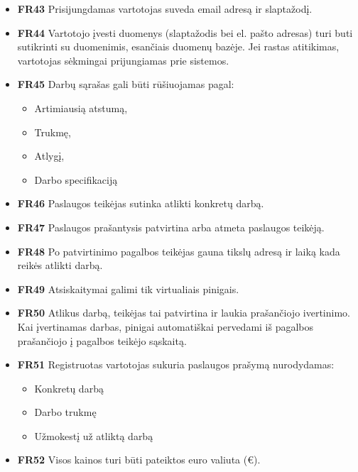 \documentclass{VUMIFPSbakalaurinis}
\begin{document}
\begin{itemize}
	\item \textbf{FR43} Prisijungdamas vartotojas suveda email adresą ir slaptažodį.
	\item \textbf{FR44} Vartotojo įvesti duomenys (slaptažodis bei el. pašto adresas) turi buti sutikrinti su duomenimis, esančiais duomenų bazėje. Jei rastas atitikimas, vartotojas sėkmingai prijungiamas prie sistemos.
\end{itemize}

\begin{itemize}
	\item \textbf{FR45} Darbų sąrašas gali būti rūšiuojamas pagal:
	\begin{itemize}
		\item Artimiausią atstumą,
		\item Trukmę,
		\item Atlygį,
		\item Darbo specifikaciją
	\end{itemize}
\end{itemize}

\begin{itemize}
	\item \textbf{FR46} Paslaugos teikėjas sutinka atlikti konkretų darbą.
	\item \textbf{FR47} Paslaugos prašantysis patvirtina arba atmeta paslaugos teikėją.
	\item \textbf{FR48} Po patvirtinimo pagalbos teikėjas gauna tikslų adresą ir laiką kada reikės atlikti darbą.
\end{itemize}

\begin{itemize}
	\item \textbf{FR49} Atsiskaitymai galimi tik virtualiais pinigais.
	\item \textbf{FR50} Atlikus darbą, teikėjas tai patvirtina ir laukia prašančiojo ivertinimo. Kai įvertinamas darbas, pinigai automatiškai pervedami iš pagalbos prašančiojo į pagalbos teikėjo sąskaitą.
\end{itemize}

\begin{itemize}
	\item \textbf{FR51} Registruotas vartotojas sukuria paslaugos prašymą nurodydamas:
	\begin{itemize}
		\item Konkretų darbą
		\item Darbo trukmę
		\item Užmokestį už atliktą darbą
	\end{itemize}
	\item \textbf{FR52} Visos kainos turi būti pateiktos euro valiuta (€).
\end{itemize}
\end{document}
